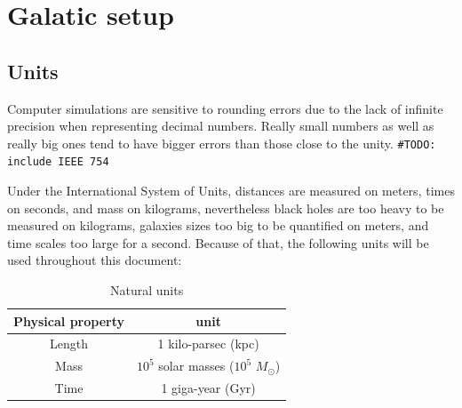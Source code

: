 
%


\newcommand{\keyword}[1]{\textit{#1}}
\newcommand{\sm}[0]{$M_\odot$}
\newcommand{\todo}[1]{\texttt{\color{red}\#TODO: #1}}


\section{Galatic setup}
	\subsection{Units}
		Computer simulations are sensitive to rounding errors due to the lack of infinite precision when representing decimal numbers. Really small numbers as well as really big ones tend to have bigger errors than those close to the unity. \todo{include IEEE 754}
		
		Under the International System of Units, distances are measured on meters, times on seconds, and mass on kilograms, nevertheless black holes are too heavy to be measured on kilograms, galaxies sizes too big to be quantified on meters, and time scales too large for a second. Because of that, the following units will be used throughout this document:
		\begin{table}[h]
			\centering
			\caption{Natural units}
			\label{tb: units}
			\begin{tabular}{c|c}
				\hline
				\textbf{Physical property} & \textbf{unit} \\
				\hline
				Length & 1 kilo-parsec (kpc) \\
				Mass & $10^5$ solar masses ($10^5$ \sm) \\
				Time & 1 giga-year (Gyr) \\
				\hline
			\end{tabular}
		\end{table}		
		

